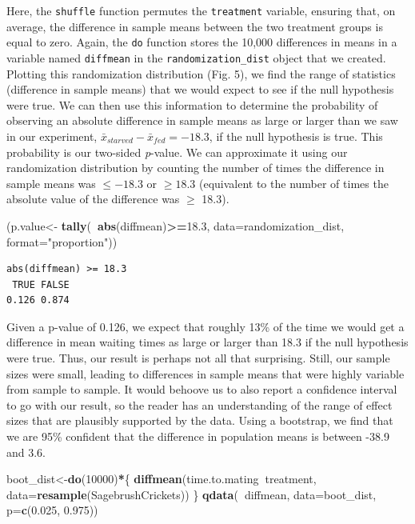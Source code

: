 \documentclass[fleqn,10pt]{wlpeerj} %
\newenvironment{Shaded}{\begin{snugshade}}{\end{snugshade}}
\newcommand{\DataTypeTok}[1]{\textcolor[rgb]{0.13,0.29,0.53}{#1}}
\newcommand{\DecValTok}[1]{\textcolor[rgb]{0.00,0.00,0.81}{#1}}
\newcommand{\FloatTok}[1]{\textcolor[rgb]{0.00,0.00,0.81}{#1}}
\newcommand{\KeywordTok}[1]{\textcolor[rgb]{0.13,0.29,0.53}{\textbf{#1}}}
\newcommand{\NormalTok}[1]{#1}
\newcommand{\OperatorTok}[1]{\textcolor[rgb]{0.81,0.36,0.00}{\textbf{#1}}}
\newcommand{\StringTok}[1]{\textcolor[rgb]{0.31,0.60,0.02}{#1}}
\begin{document}
Here, the \texttt{shuffle} function permutes the \texttt{treatment} variable, ensuring that, on average, the difference in sample means between the two treatment groups is equal to zero. Again, the \texttt{do} function stores the 10,000 differences in means in a variable named \texttt{diffmean} in the \texttt{randomization\_dist} object that we created. Plotting this randomization distribution (Fig. 5), we find the range of statistics (difference in sample means) that we would expect to see if the null hypothesis were true. We can then use this information to determine the probability of observing an absolute difference in sample means as large or larger than we saw in our experiment, \(\bar{x}_{starved}-\bar{x}_{fed}=-18.3\), if the null hypothesis is true. This probability is our two-sided \emph{p}-value. We can approximate it using our randomization distribution by counting the number of times the difference in sample means was \(\le -18.3\) or \(\ge 18.3\) (equivalent to the number of times the absolute value of the difference was \(\ge\) 18.3).

\begin{Shaded}
\begin{Highlighting}[]
\NormalTok{(p.value<-}\StringTok{ }\KeywordTok{tally}\NormalTok{(}\OperatorTok{~}\KeywordTok{abs}\NormalTok{(diffmean)}\OperatorTok{>=}\FloatTok{18.3}\NormalTok{, }\DataTypeTok{data=}\NormalTok{randomization_dist,}
                 \DataTypeTok{format=}\StringTok{"proportion"}\NormalTok{)) }
\end{Highlighting}
\end{Shaded}

\begin{verbatim}
abs(diffmean) >= 18.3
 TRUE FALSE 
0.126 0.874 
\end{verbatim}

Given a p-value of 0.126, we expect that roughly 13\% of the time we would get a difference in mean waiting times as large or larger than 18.3 if the null hypothesis were true. Thus, our result is perhaps not all that surprising. Still, our sample sizes were small, leading to differences in sample means that were highly variable from sample to sample. It would behoove us to also report a confidence interval to go with our result, so the reader has an understanding of the range of effect sizes that are plausibly supported by the data. Using a bootstrap, we find that we are 95\% confident that the difference in population means is between -38.9 and 3.6.

\begin{Shaded}
\begin{Highlighting}[]
\NormalTok{boot_dist<-}\KeywordTok{do}\NormalTok{(}\DecValTok{10000}\NormalTok{)}\OperatorTok{*}\NormalTok{\{}
  \KeywordTok{diffmean}\NormalTok{(time.to.mating}\OperatorTok{~}\NormalTok{treatment, }\DataTypeTok{data=}\KeywordTok{resample}\NormalTok{(SagebrushCrickets))}
\NormalTok{\}  }
\KeywordTok{qdata}\NormalTok{(}\OperatorTok{~}\NormalTok{diffmean, }\DataTypeTok{data=}\NormalTok{boot_dist, }\DataTypeTok{p=}\KeywordTok{c}\NormalTok{(}\FloatTok{0.025}\NormalTok{, }\FloatTok{0.975}\NormalTok{))}
\end{Highlighting}
\end{Shaded}
\end{document}
